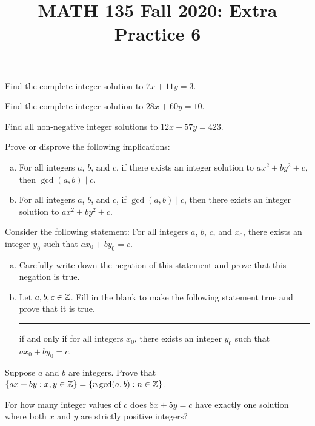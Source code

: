 
\title{MATH 135 Fall 2020: Extra Practice 6}


\thispagestyle{firstpage}

\textbf{\@title}


\question Find the complete integer solution to $7x+11y=3$.


\question Find the complete integer solution to $28x+60y=10$.



\question Find all non-negative integer solutions to $12x+57y=423$.


\question Prove or disprove the following implications:
\begin{enumerate}[(a)]
  \item For all integers $a$, $b$, and $c$, if there exists an integer solution to $ax^2+by^2+c$,
        then $\gcd(a,b) \mid c$.
  \item For all integers $a$, $b$, and $c$, if $\gcd(a,b) \mid c$,
        then there exists an integer solution to $ax^2+by^2+c$.
\end{enumerate}


\question Consider the following statement:
For all integers $a$, $b$, $c$, and $x_0$, there exists an integer $y_0$ such that $ax_0+by_0=c$.
\begin{enumerate}[(a)]
  \item Carefully write down the negation of this statement and prove that this negation is true.
  \item Let $a,b,c\in\mathbb{Z}$.
        Fill in the blank to make the following statement true and prove that it is true.
        \rule{3cm}{0.15mm} if and only if for all integers $x_0$,
        there exists an integer $y_0$ such that $ax_0+by_0=c$.
\end{enumerate}


\question Suppose $a$ and $b$ are integers.
Prove that $\{ax+by : x,y\in\mathbb{Z}\} = {\{n\gcd(a,b) : n\in\mathbb{Z}\}}$.



\question For how many integer values of $c$ does $8x+5y=c$ have exactly one solution
where both $x$ and $y$ are strictly positive integers?



